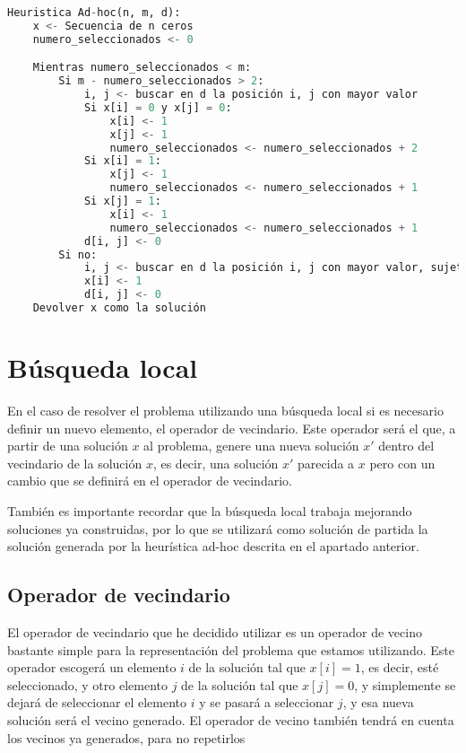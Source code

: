 \begin{lstlisting}[language=python]
Heuristica Ad-hoc(n, m, d):
	x <- Secuencia de n ceros
	numero_seleccionados <- 0

	Mientras numero_seleccionados < m:
		Si m - numero_seleccionados > 2:
			i, j <- buscar en d la posición i, j con mayor valor
			Si x[i] = 0 y x[j] = 0:
				x[i] <- 1
				x[j] <- 1
				numero_seleccionados <- numero_seleccionados + 2
			Si x[i] = 1:
				x[j] <- 1
				numero_seleccionados <- numero_seleccionados + 1
			Si x[j] = 1:
				x[i] <- 1
				numero_seleccionados <- numero_seleccionados + 1
			d[i, j] <- 0
		Si no:
			i, j <- buscar en d la posición i, j con mayor valor, sujeto a que x[j] = 1
			x[i] <- 1
			d[i, j] <- 0
	Devolver x como la solución
\end{lstlisting}

\newpage

\section{Búsqueda local}

En el caso de resolver el problema utilizando una búsqueda local si es necesario definir un nuevo elemento, el operador de vecindario. Este operador será el que, a partir de una solución $x$ al problema, genere una nueva solución $x'$ dentro del vecindario de la solución $x$, es decir, una solución $x'$ parecida a $x$ pero con un cambio que se definirá en el operador de vecindario.

También es importante recordar que la búsqueda local trabaja mejorando soluciones ya construidas, por lo que se utilizará como solución de partida la solución generada por la heurística ad-hoc descrita en el apartado anterior.

\subsection{Operador de vecindario}

El operador de vecindario que he decidido utilizar es un operador de vecino bastante simple para la representación del problema que estamos utilizando. Este operador escogerá un elemento $i$ de la solución tal que $x[i] = 1$, es decir, esté seleccionado, y otro elemento $j$ de la solución tal que $x[j] = 0$, y simplemente se dejará de seleccionar el elemento $i$ y se pasará a seleccionar $j$, y esa nueva solución será el vecino generado. El operador de vecino también tendrá en cuenta los vecinos ya generados, para no repetirlos


